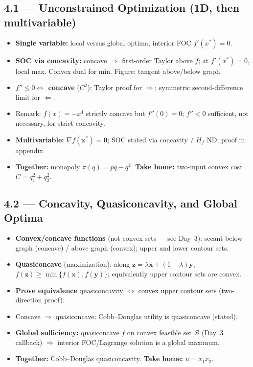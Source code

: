 \documentclass[11pt,a4paper]{article}
\begin{document}
\subsection{4.1 --- Unconstrained Optimization (1D, then multivariable)}
\begin{itemize}[leftmargin=*]
    \item \textbf{Single variable:} local versus global optima; interior FOC $f'(x^*)=0$.
    \item \textbf{SOC via concavity:} concave $\Rightarrow$ first-order Taylor above $f$; at $f'(x^*)=0$, local max.
      Convex dual for min. Figure: tangent above/below graph.
    \item \textbf{$f''\le 0\Leftrightarrow$ concave} ($C^2$): Taylor proof for $\Rightarrow$;
      symmetric second-difference limit for $\Leftarrow$.
    \item Remark: $f(x)=-x^4$ strictly concave but $f''(0)=0$; $f''<0$ sufficient, not necessary, for strict concavity.
    \item \textbf{Multivariable:} $\nabla f(\mathbf{x}^*)=\mathbf{0}$; SOC stated via concavity / $H_f$ ND;
      proof in appendix.
    \item \textbf{Together:} monopoly $\pi(q)=pq-q^2$. \textbf{Take home:} two-input convex cost $C=q_1^2+q_2^2$.
\end{itemize}

\subsection{4.2 --- Concavity, Quasiconcavity, and Global Optima}
\begin{itemize}[leftmargin=*]
    \item \textbf{Convex/concave functions} (not convex sets --- see Day~3):
      secant below graph (concave) / above graph (convex); upper and lower contour sets.
    \item \textbf{Quasiconcave} (maximization): along $\mathbf{z}=\lambda\mathbf{x}+(1-\lambda)\mathbf{y}$,
      $f(\mathbf{z})\ge\min\{f(\mathbf{x}),f(\mathbf{y})\}$; equivalently upper contour sets are convex.
    \item \textbf{Prove equivalence} quasiconcavity $\Leftrightarrow$ convex upper contour sets (two-direction proof).
    \item Concave $\Rightarrow$ quasiconcave; Cobb--Douglas utility is quasiconcave (stated).
    \item \textbf{Global sufficiency:} quasiconcave $f$ on convex feasible set $\mathcal{B}$
      (Day~3 callback) $\Rightarrow$ interior FOC/Lagrange solution is a global maximum.
    \item \textbf{Together:} Cobb--Douglas quasiconcavity. \textbf{Take home:} $u=x_1x_2$.
\end{itemize}
\end{document}
